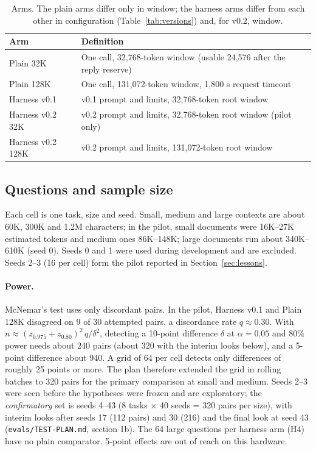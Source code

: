 \documentclass[11pt]{article}
\newcommand{\code}[1]{\texttt{#1}}
\begin{document}
\begin{table}[t]
\centering\small
\caption{Arms. The plain arms differ only in window; the harness arms differ from
each other in configuration (Table~\ref{tab:versions}) and, for v0.2, window.}
\label{tab:arms}
\begin{tabularx}{\linewidth}{lX}
\toprule
Arm & Definition \\
\midrule
Plain 32K & One call, 32,768-token window (usable 24,576 after the reply reserve) \\
Plain 128K & One call, 131,072-token window, 1,800 s request timeout \\
Harness v0.1 & v0.1 prompt and limits, 32,768-token root window \\
Harness v0.2 32K & v0.2 prompt and limits, 32,768-token root window (pilot only) \\
Harness v0.2 128K & v0.2 prompt and limits, 131,072-token root window \\
\bottomrule
\end{tabularx}
\end{table}

\subsection{Questions and sample size}
Each cell is one task, size and seed. Small, medium and large contexts are about
60K, 300K and 1.2M characters; in the pilot, small documents were 16K--27K estimated tokens and medium ones
86K--148K; large documents run about 340K--610K (seed 0). Seeds 0 and
1 were used during development and are excluded. Seeds 2--3 (16 per cell) form the
pilot reported in Section~\ref{sec:lessons}.

\paragraph{Power.} McNemar's test uses only discordant pairs. In the pilot, Harness
v0.1 and Plain 128K disagreed on 9 of 30 attempted pairs, a discordance rate
$q \approx 0.30$. With $n \approx (z_{0.975} + z_{0.80})^2\, q / \delta^2$, detecting a
10-point difference $\delta$ at $\alpha = 0.05$ and 80\% power needs about 240 pairs
(about 320 with the interim looks below), and a 5-point difference about 940. A grid of
64 per cell detects only differences of roughly 25 points or more. The plan therefore
extended the grid in rolling batches to 320 pairs for the primary comparison at small
and medium. Seeds 2--3 were seen before the hypotheses were frozen and are exploratory;
the \emph{confirmatory} set is seeds 4--43 (8 tasks $\times$ 40 seeds = 320 pairs per
size), with interim looks after seeds 17 (112 pairs) and 30 (216) and the final look at
seed 43 (\code{evals/TEST-PLAN.md}, section 1b). The 64 large questions per harness arm
(H4) have no plain comparator. 5-point effects are out of reach on this hardware.
\end{document}

